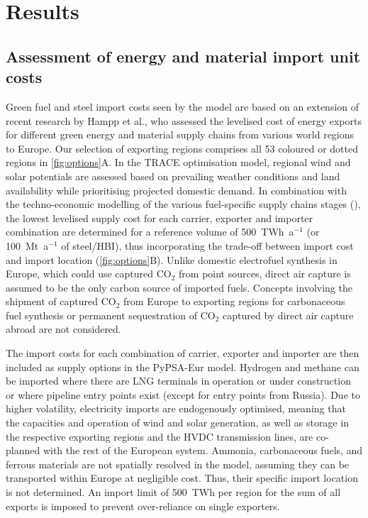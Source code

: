 
\section*{Results}

\subsection*{Assessment of energy and material import unit costs}
\label{sec:results-1}



Green fuel and steel import costs seen by the model are based on an extension of
recent research by Hampp et al.,\cite{hamppImportOptions2023} who assessed the
levelised cost of energy exports for different green energy and material supply
chains from various world regions to Europe. Our selection of exporting regions
comprises all 53 coloured or dotted regions in \cref{fig:options}A. In the
TRACE optimisation model,\cite{hamppImportOptions2023} regional wind and solar
potentials are assessed based on prevailing weather conditions and land
availability while prioritising projected domestic demand. In combination with
the techno-economic modelling of the various fuel-specific supply chains stages
(), the lowest levelised supply cost for each
carrier, exporter and importer combination are determined for a reference volume
of 500~TWh~a$^{-1}$ (or 100~Mt~a$^{-1}$ of steel/HBI), thus incorporating the
trade-off between import cost and import location (\cref{fig:options}B).
Unlike domestic electrofuel synthesis in Europe, which could use captured CO$_2$
from point sources, direct air capture is assumed to be the only carbon source
of imported fuels. Concepts involving the shipment of captured CO$_2$ from
Europe to exporting regions for carbonaceous fuel synthesis or permanent
sequestration of CO$_2$ captured by direct air capture abroad are not
considered.\cite{treeenergysolutionsGreenCycle2024,fonderSyntheticMethaneClosing2024}


The import costs for each combination of carrier, exporter and importer are then
included as supply options in the PyPSA-Eur model. Hydrogen and methane can be
imported where there are LNG terminals in operation or under construction or
where pipeline entry points exist (except for entry points from Russia). Due to
higher volatility, electricity imports are endogenously optimised, meaning that
the capacities and operation of wind and solar generation, as well as storage in
the respective exporting regions and the HVDC transmission lines, are co-planned
with the rest of the European system. Ammonia, carbonaceous fuels, and ferrous
materials are not spatially resolved in the model, assuming they can be
transported within Europe at negligible cost. Thus, their specific import
location is not determined. An import limit of 500~TWh per region for the sum of
all exports is imposed to prevent over-reliance on single exporters.

